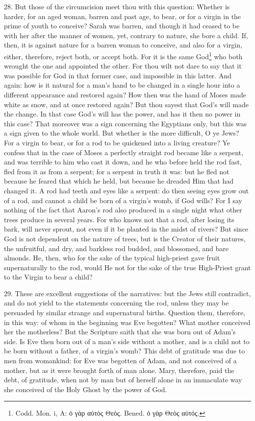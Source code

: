 28. But those of the circumcision meet thou with this question: Whether is harder, for an aged woman, barren and past age, to bear, or for a virgin in the prime of youth to conceive? Sarah was barren, and though it had ceased to be with her after the manner of women, yet, contrary to nature, she bore a child. If, then, it is against nature for a barren woman to conceive, and also for a virgin, either, therefore, reject both, or accept both. For it is the same God\footnote{Codd. Mon. i, A: \textgreek{ὁ γὰρ αὐτὸς Θεός}. Bened. \textgreek{ὁ γὰρ Θεὸς αὐτός}.} who both wrought the one and appointed the other. For thou wilt not dare to say that it was possible for God in that former case, and impossible in this latter. And again: how is it natural for a man’s hand to be changed in a single hour into a different appearance and restored again? How then was the hand of Moses made white as snow, and at once restored again? But thou sayest that God’s will made the change. In that case God’s will has the power, and has it then no power in this case? That moreover was a sign concerning the Egyptians only, but this was a sign given to the whole world. But whether is the more difficult, O ye Jews? For a virgin to bear, or for a rod to be quickened into a living creature? Ye confess that in the case of Moses a perfectly straight rod became like a serpent, and was terrible to him who cast it down, and he who before held the rod fast, fled from it as from a serpent; for a serpent in truth it was: but he fled not because he feared that which he held, but because he dreaded Him that had changed it. A rod had teeth and eyes like a serpent: do then seeing eyes grow out of a rod, and cannot a child be born of a virgin’s womb, if God wills? For I say nothing of the fact that Aaron’s rod also produced in a single night what other trees produce in several years. For who knows not that a rod, after losing its bark, will never sprout, not even if it be planted in the midst of rivers? But since God is not dependent on the nature of trees, but is the Creator of their natures, the unfruitful, and dry, and barkless rod budded, and blossomed, and bare almonds. He, then, who for the sake of the typical high-priest gave fruit supernaturally to the rod, would He not for the sake of the true High-Priest grant to the Virgin to bear a child?

29. These are excellent suggestions of the narratives: but the Jews still contradict, and do not yield to the statements concerning the rod, unless they may be persuaded by similar strange and supernatural births. Question them, therefore, in this way: of whom in the beginning was Eve begotten? What mother conceived her the motherless? But the Scripture saith that she was born out of Adam’s side. Is Eve then born out of a man’s side without a mother, and is a child not to be born without a father, of a virgin’s womb? This debt of gratitude was due to men from womankind: for Eve was begotten of Adam, and not conceived of a mother, but as it were brought forth of man alone. Mary, therefore, paid the debt, of gratitude, when not by man but of herself alone in an immaculate way she conceived of the Holy Ghost by the power of God.

